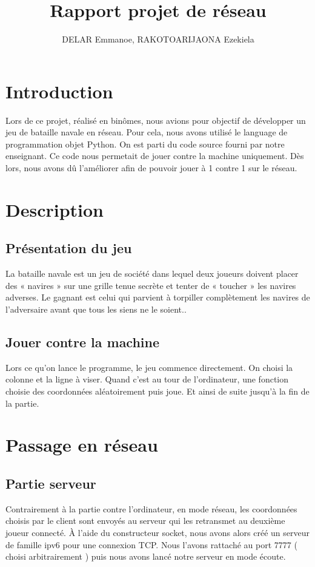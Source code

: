 \documentclass{article}
\title{Rapport projet de r\'eseau}
\author{DELAR Emmanoe, RAKOTOARIJAONA Ezekiela}
\begin{document}
\maketitle
\newpage
\tableofcontents

\newpage
\section{Introduction}
Lors de ce projet, r\'ealis\'e en bin\^omes, nous avions pour objectif de d\'evelopper un jeu de bataille navale en r\'eseau. Pour cela, nous avons utilis\'e le language de programmation objet Python.
On est parti du code source fourni par notre enseignant. Ce code nous permetait de jouer contre la machine uniquement. D\`es lors, nous avons d\^u l'am\'eliorer afin de pouvoir jouer \`a 1 contre 1 sur le r\'eseau.  

\section{Description}
	 \subsection{Pr\'esentation du jeu}
	 La bataille navale est un jeu de soci\'et\'e dans lequel deux joueurs doivent placer des « navires » sur une grille tenue secrète et tenter de « toucher » les navires adverses. Le gagnant est celui qui parvient à torpiller compl\`etement les navires de l'adversaire avant que tous les siens ne le soient..

	 \subsection{Jouer contre la machine}
	 Lors ce qu'on lance le programme, le jeu commence directement. On choisi la colonne et la ligne \`a viser. Quand c'est au tour de l'ordinateur, une fonction choisie des coordonn\'ees al\'eatoirement puis joue. Et ainsi de suite jusqu'\`a la fin de la partie. 

\section{Passage en r\'eseau}
	\subsection{Partie serveur}
	Contrairement \`a la partie contre l'ordinateur, en mode r\'eseau, les coordonn\'ees choisis par le client sont envoy\'es au serveur qui les retransmet au deuxi\`eme joueur connect\'e.
	\`A l'aide du constructeur socket, nous avons alors cr\'e\'e un serveur de famille ipv6 pour une connexion TCP.
	Nous l'avons rattach\'e au port 7777 ( choisi arbitrairement ) puis nous avons lanc\'e notre serveur en mode \'ecoute.
\end{document}
